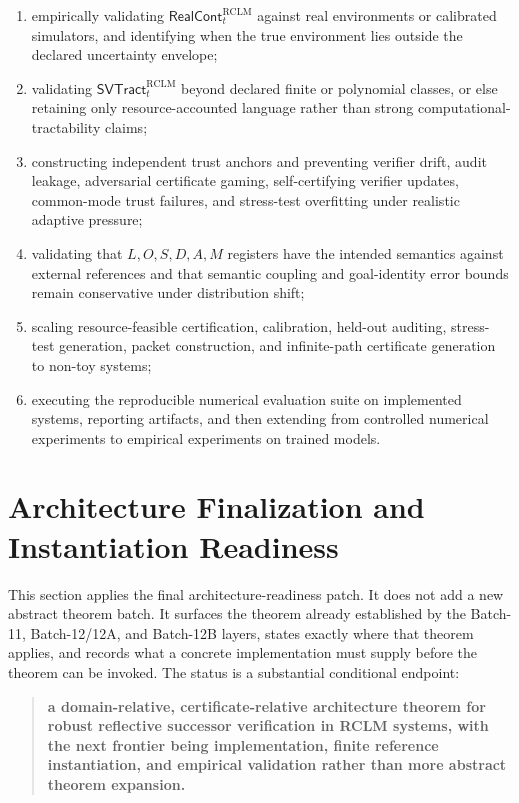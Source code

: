 \documentclass[11pt,a4paper]{article}
\newcommand{\RCLM}{\mathrm{RCLM}}
\begin{document}
\begin{enumerate}[leftmargin=1.5em]
    \item empirically validating \(\mathsf{RealCont}_t^{\RCLM}\) against real environments or calibrated simulators, and identifying when the true environment lies outside the declared uncertainty envelope;
    \item validating \(\mathsf{SVTract}_t^{\RCLM}\) beyond declared finite or polynomial classes, or else retaining only resource-accounted language rather than strong computational-tractability claims;
    \item constructing independent trust anchors and preventing verifier drift, audit leakage, adversarial certificate gaming, self-certifying verifier updates, common-mode trust failures, and stress-test overfitting under realistic adaptive pressure;
    \item validating that \(L,O,S,D,A,M\) registers have the intended semantics against external references and that semantic coupling and goal-identity error bounds remain conservative under distribution shift;
    \item scaling resource-feasible certification, calibration, held-out auditing, stress-test generation, packet construction, and infinite-path certificate generation to non-toy systems;
    \item executing the reproducible numerical evaluation suite on implemented systems, reporting artifacts, and then extending from controlled numerical experiments to empirical experiments on trained models.
\end{enumerate}

\section{Architecture Finalization and Instantiation Readiness}
\label{sec:architecture-finalization-instantiation-readiness}

This section applies the final architecture-readiness patch.  It does not add a new abstract theorem batch.  It surfaces the theorem already established by the Batch-11, Batch-12/12A, and Batch-12B layers, states exactly where that theorem applies, and records what a concrete implementation must supply before the theorem can be invoked.  The status is a substantial conditional endpoint:
\begin{quote}
\textbf{a domain-relative, certificate-relative architecture theorem for robust reflective successor verification in RCLM systems, with the next frontier being implementation, finite reference instantiation, and empirical validation rather than more abstract theorem expansion.}
\end{quote}
\end{document}
